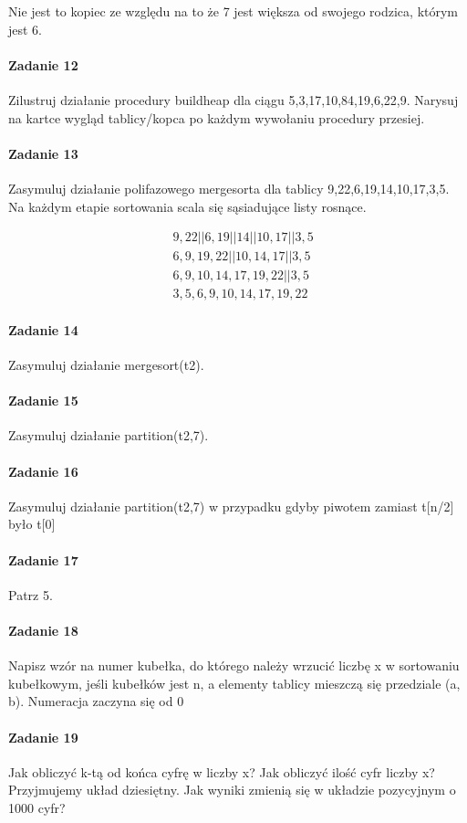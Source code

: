\documentclass[18pt]{extarticle}
\begin{document}
Nie jest to kopiec ze względu na to że 7 jest większa od swojego rodzica, którym jest 6. \\ 

\paragraph{Zadanie 12} Zilustruj działanie procedury buildheap dla ciągu {5,3,17,10,84,19,6,22,9}. Narysuj na kartce wygląd tablicy/kopca po każdym wywołaniu procedury przesiej.

\paragraph{Zadanie 13} Zasymuluj działanie polifazowego mergesorta dla tablicy {9,22,6,19,14,10,17,3,5}. Na każdym etapie sortowania scala się sąsiadujące listy rosnące.


\begin{align*}
    &{9,22 || 6,19 || 14 || 10,17 || 3,5} \\
    &{6,9,19,22 || 10,14,17 || 3,5} \\
    &{6,9,10,14,17,19,22 || 3,5} \\
    &{3,5,6,9,10,14,17,19,22}
\end{align*}

\paragraph{Zadanie 14} Zasymuluj działanie mergesort(t2).



\paragraph{Zadanie 15} Zasymuluj działanie partition(t2,7).

\paragraph{Zadanie 16} Zasymuluj działanie partition(t2,7) w przypadku gdyby piwotem zamiast t[n/2] było t[0]

\paragraph{Zadanie 17} Patrz 5.

\paragraph{Zadanie 18} Napisz wzór na numer kubełka, do którego należy wrzucić liczbę x w sortowaniu kubełkowym, jeśli kubełków jest n, a elementy tablicy mieszczą się przedziale (a, b). Numeracja zaczyna się od 0

\paragraph{Zadanie 19} Jak obliczyć k-tą od końca cyfrę w liczby x? Jak obliczyć ilość cyfr liczby x? Przyjmujemy układ dziesiętny. Jak wyniki zmienią się w układzie pozycyjnym o 1000 cyfr?
\end{document}
